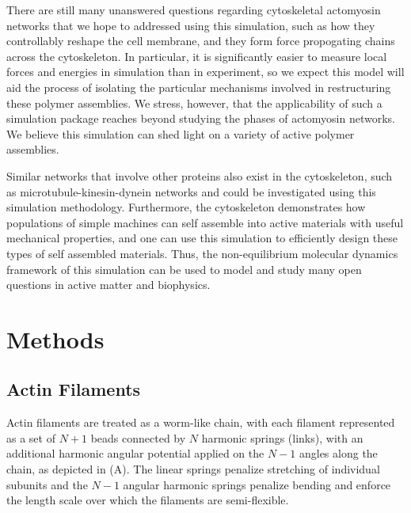 \documentclass[12pt]{article} \usepackage{times} \usepackage{graphicx}
\begin{document}
\par There are still many unanswered questions regarding cytoskeletal
actomyosin networks that we hope to addressed using this simulation, such as
how they controllably reshape the cell membrane, and they form force
propogating chains across the cytoskeleton.  In particular, it is significantly
easier to measure local forces and energies in simulation than in experiment,
so we expect this model will aid the process of isolating the particular
mechanisms involved in restructuring these polymer assemblies. We stress,
however, that the applicability of such a simulation package reaches beyond
studying the phases of actomyosin networks.  We believe this simulation can
shed light on a variety of active polymer assemblies.  \par Similar networks
that involve other proteins also exist in the cytoskeleton, such as
microtubule-kinesin-dynein networks and could be investigated using this
simulation methodology.  Furthermore, the cytoskeleton demonstrates how
populations of simple machines can self assemble into active materials with
useful mechanical properties, and one can use this simulation to efficiently
design these types of self assembled materials. Thus, the non-equilibrium
molecular dynamics framework of this simulation can be used to model and study
many open questions in active matter and biophysics.

\section{Methods}  \subsection{Actin Filaments} Actin filaments are treated as
a worm-like chain, with each filament represented as a set of $N+1$ beads
connected by $N$ harmonic springs (links), with an additional harmonic angular
potential applied on the $N-1$ angles along the chain, as depicted in
(A). The linear springs penalize stretching of individual
subunits and the $N-1$ angular harmonic springs penalize bending and enforce
the length scale over which the filaments are semi-flexible. 
\end{document}

